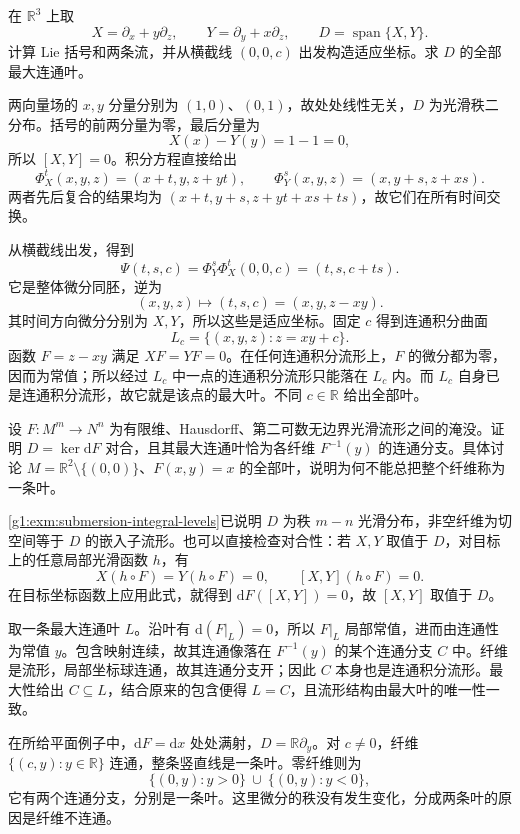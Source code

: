 \begin{exercise}\label{g1:ex:frobenius-explicit-graph}
	在 \(\mathbb R^3\) 上取
	\[
		X=\partial_x+y\partial_z,\qquad
		Y=\partial_y+x\partial_z,\qquad
		D=\operatorname{span}\{X,Y\}.
	\]
	计算 Lie 括号和两条流，并从横截线 \((0,0,c)\) 出发构造适应坐标。求 \(D\) 的全部最大连通叶。
\end{exercise}
\begin{solution}
	两向量场的 \(x,y\) 分量分别为 \((1,0)\)、\((0,1)\)，故处处线性无关，\(D\) 为光滑秩二分布。括号的前两分量为零，最后分量为
	\[
		X(x)-Y(y)=1-1=0,
	\]
	所以 \([X,Y]=0\)。积分方程直接给出
	\[
		\Phi_X^t(x,y,z)=(x+t,y,z+yt),\qquad
		\Phi_Y^s(x,y,z)=(x,y+s,z+xs).
	\]
	两者先后复合的结果均为 \((x+t,y+s,z+yt+xs+ts)\)，故它们在所有时间交换。

	从横截线出发，得到
	\[
		\Psi(t,s,c)=\Phi_Y^s\Phi_X^t(0,0,c)=(t,s,c+ts).
	\]
	它是整体微分同胚，逆为
	\[
		(x,y,z)\longmapsto(t,s,c)=(x,y,z-xy).
	\]
	其时间方向微分分别为 \(X,Y\)，所以这些是适应坐标。固定 \(c\) 得到连通积分曲面
	\[
		L_c=\{(x,y,z):z=xy+c\}.
	\]
	函数 \(F=z-xy\) 满足 \(XF=YF=0\)。在任何连通积分流形上，\(F\) 的微分都为零，因而为常值；所以经过 \(L_c\) 中一点的连通积分流形只能落在 \(L_c\) 内。而 \(L_c\) 自身已是连通积分流形，故它就是该点的最大叶。不同 \(c\in\mathbb R\) 给出全部叶。
\end{solution}

\begin{exercise}\label{g1:ex:submersion-fiber-leaves}
	设 \(F:M^m\to N^n\) 为有限维、Hausdorff、第二可数无边界光滑流形之间的淹没。证明 \(D=\ker\mathrm{d}F\) 对合，且其最大连通叶恰为各纤维 \(F^{-1}(y)\) 的连通分支。具体讨论 \(M=\mathbb R^2\setminus\{(0,0)\}\)、\(F(x,y)=x\) 的全部叶，说明为何不能总把整个纤维称为一条叶。
\end{exercise}
\begin{solution}
	\cref{g1:exm:submersion-integral-levels}已说明 \(D\) 为秩 \(m-n\) 光滑分布，非空纤维为切空间等于 \(D\) 的嵌入子流形。也可以直接检查对合性：若 \(X,Y\) 取值于 \(D\)，对目标上的任意局部光滑函数 \(h\)，有
	\[
		X(h\circ F)=Y(h\circ F)=0,
		\qquad [X,Y](h\circ F)=0.
	\]
	在目标坐标函数上应用此式，就得到 \(\mathrm{d}F([X,Y])=0\)，故 \([X,Y]\) 取值于 \(D\)。

	取一条最大连通叶 \(L\)。沿叶有 \(\mathrm{d}(F|_L)=0\)，所以 \(F|_L\) 局部常值，进而由连通性为常值 \(y\)。包含映射连续，故其连通像落在 \(F^{-1}(y)\) 的某个连通分支 \(C\) 中。纤维是流形，局部坐标球连通，故其连通分支开；因此 \(C\) 本身也是连通积分流形。最大性给出 \(C\subseteq L\)，结合原来的包含便得 \(L=C\)，且流形结构由最大叶的唯一性一致。

	在所给平面例子中，\(\mathrm{d}F=\mathrm{d}x\) 处处满射，\(D=\mathbb R\partial_y\)。对 \(c\ne0\)，纤维 \(\{(c,y):y\in\mathbb R\}\) 连通，整条竖直线是一条叶。零纤维则为
	\[
		\{(0,y):y>0\}\ \cup\ \{(0,y):y<0\},
	\]
	它有两个连通分支，分别是一条叶。这里微分的秩没有发生变化，分成两条叶的原因是纤维不连通。
\end{solution}

